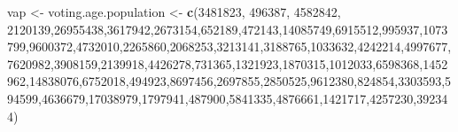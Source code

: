 \documentclass[]{article}
\newenvironment{Shaded}{\begin{snugshade}}{\end{snugshade}}
\newcommand{\KeywordTok}[1]{\textcolor[rgb]{0.13,0.29,0.53}{\textbf{#1}}}
\newcommand{\DecValTok}[1]{\textcolor[rgb]{0.00,0.00,0.81}{#1}}
\newcommand{\StringTok}[1]{\textcolor[rgb]{0.31,0.60,0.02}{#1}}
\newcommand{\NormalTok}[1]{#1}
\begin{document}
\begin{Shaded}
\begin{Highlighting}[]
\NormalTok{vap <-}\StringTok{ }\NormalTok{voting.age.population <-}\StringTok{ }\KeywordTok{c}\NormalTok{(}\DecValTok{3481823}\NormalTok{, }\DecValTok{496387}\NormalTok{, }\DecValTok{4582842}\NormalTok{, }\DecValTok{2120139}\NormalTok{,}\DecValTok{26955438}\NormalTok{,}\DecValTok{3617942}\NormalTok{,}\DecValTok{2673154}\NormalTok{,}\DecValTok{652189}\NormalTok{,}\DecValTok{472143}\NormalTok{,}\DecValTok{14085749}\NormalTok{,}\DecValTok{6915512}\NormalTok{,}\DecValTok{995937}\NormalTok{,}\DecValTok{1073799}\NormalTok{,}\DecValTok{9600372}\NormalTok{,}\DecValTok{4732010}\NormalTok{,}\DecValTok{2265860}\NormalTok{,}\DecValTok{2068253}\NormalTok{,}\DecValTok{3213141}\NormalTok{,}\DecValTok{3188765}\NormalTok{,}\DecValTok{1033632}\NormalTok{,}\DecValTok{4242214}\NormalTok{,}\DecValTok{4997677}\NormalTok{,}\DecValTok{7620982}\NormalTok{,}\DecValTok{3908159}\NormalTok{,}\DecValTok{2139918}\NormalTok{,}\DecValTok{4426278}\NormalTok{,}\DecValTok{731365}\NormalTok{,}\DecValTok{1321923}\NormalTok{,}\DecValTok{1870315}\NormalTok{,}\DecValTok{1012033}\NormalTok{,}\DecValTok{6598368}\NormalTok{,}\DecValTok{1452962}\NormalTok{,}\DecValTok{14838076}\NormalTok{,}\DecValTok{6752018}\NormalTok{,}\DecValTok{494923}\NormalTok{,}\DecValTok{8697456}\NormalTok{,}\DecValTok{2697855}\NormalTok{,}\DecValTok{2850525}\NormalTok{,}\DecValTok{9612380}\NormalTok{,}\DecValTok{824854}\NormalTok{,}\DecValTok{3303593}\NormalTok{,}\DecValTok{594599}\NormalTok{,}\DecValTok{4636679}\NormalTok{,}\DecValTok{17038979}\NormalTok{,}\DecValTok{1797941}\NormalTok{,}\DecValTok{487900}\NormalTok{,}\DecValTok{5841335}\NormalTok{,}\DecValTok{4876661}\NormalTok{,}\DecValTok{1421717}\NormalTok{,}\DecValTok{4257230}\NormalTok{,}\DecValTok{392344}\NormalTok{)}


\end{Highlighting}
\end{Shaded}
\end{document}
